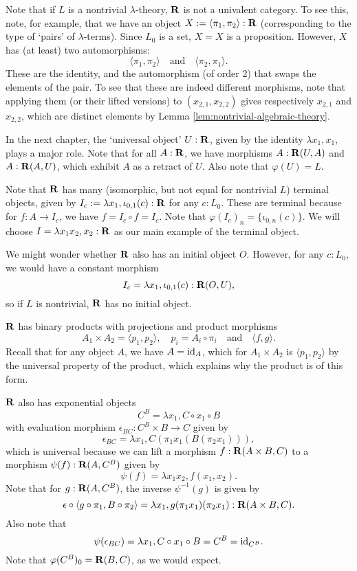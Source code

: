 \begin{remark}
  Note that if $ L $ is a nontrivial $ \lambda $-theory, $ \mathbf{R} $ is not a univalent category. To see this, note, for example, that we have an object $ X := \langle \pi_1, \pi_2 \rangle : \mathbf{R} $ (corresponding to the type of `pairs' of $ \lambda $-terms). Since $ L_0 $ is a set, $ X = X $ is a proposition. However, $ X $ has (at least) two automorphisms:
  \[ \langle \pi_1, \pi_2 \rangle \quad \text{and} \quad \langle \pi_2, \pi_1 \rangle. \]
  These are the identity, and the automorphism (of order 2) that swaps the elements of the pair. To see that these are indeed different morphisms, note that applying them (or their lifted versions) to $ (x_{2, 1}, x_{2, 2}) $ gives respectively $ x_{2, 1} $ and $ x_{2, 2} $, which are distinct elements by Lemma \ref{lem:nontrivial-algebraic-theory}.
\end{remark}

In the next chapter, the `universal object' $ U : \mathbf{R} $, given by the identity $ \lambda x_1, x_1 $, plays a major role. Note that for all $ A: \mathbf{R} $, we have morphisms $ A: \mathbf{R}(U, A) $ and $ A: \mathbf{R}(A, U) $, which exhibit $ A $ as a retract of $ U $. Also note that $ \varphi(U) = L $.

Note that $ \mathbf{R} $ has many (isomorphic, but not equal for nontrivial $ L $) terminal objects, given by $ I_c := \lambda x_1, \iota_{0, 1}(c) : \mathbf{R} $ for any $ c: L_0 $. These are terminal because for $ f: A \to I_c $, we have $ f = I_c \circ f = I_c $. Note that $ \varphi(I_c)_n = \{ \iota_{0, n}(c) \} $. We will choose $ I = \lambda x_1 x_2, x_2 : \mathbf{R} $ as our main example of the terminal object.

We might wonder whether $ \mathbf{R} $ also has an initial object $ O $. However, for any $ c: L_0 $, we would have a constant morphism
\[ I_c = \lambda x_1, \iota_{0, 1}(c) : \mathbf{R}(O, U), \]
so if $ L $ is nontrivial, $ \mathbf{R} $ has no initial object.

$ \mathbf{R} $ has binary products with projections and product morphisms
\[ A_1 \times A_2 = \langle p_1, p_2 \rangle, \quad p_i = A_i \circ \pi_i \quad \text{and} \quad \langle f, g \rangle. \]
Recall that for any object $ A $, we have $ A = \text{id}_{A} $, which for $ A_1 \times A_2 $ is $ \langle p_1, p_2 \rangle $ by the universal property of the product, which explains why the product is of this form.

$ \mathbf{R} $ also has exponential objects
\[ C^B = \lambda x_1, C \circ x_1 \circ B \]
with evaluation morphism $ \epsilon_{BC}: C^B \times B \to C $ given by
\[ \epsilon_{BC} = \lambda x_1, C(\pi_1 x_1 (B (\pi_2 x_1))), \]
which is universal because we can lift a morphism $ f: \mathbf{R}(A \times B, C) $ to a morphism $ \psi(f): \mathbf{R}(A, C^B) $ given by
\[ \psi(f) = \lambda x_1 x_2, f (x_1, x_2). \]
Note that for $ g: \mathbf{R}(A, C^B) $, the inverse $ \psi^{-1}(g) $ is given by
\[ \epsilon \circ \langle g \circ \pi_1, B \circ \pi_2 \rangle = \lambda x_1, g (\pi_1 x_1) (\pi_2 x_1): \mathbf{R}(A \times B, C). \]
Also note that
\[ \psi(\epsilon_{BC}) = \lambda x_1, C \circ x_1 \circ B = C^B = \text{id}_{C^B}. \]
Note that $ \varphi(C^B)_0 = \mathbf{R}(B, C) $, as we would expect.

